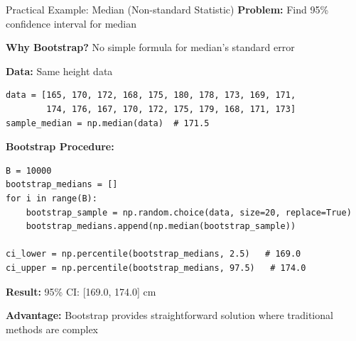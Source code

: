 \documentclass[aspectratio=169]{beamer}
\begin{document}
\begin{frame}[fragile]{Practical Example: Median (Non-standard Statistic)}
\scriptsize
\textbf{Problem:} Find 95\% confidence interval for median

\vspace{0.05cm}
\textbf{Why Bootstrap?} No simple formula for median's standard error

\vspace{0.05cm}
\textbf{Data:} Same height data
\begin{lstlisting}[basicstyle=\tiny]
data = [165, 170, 172, 168, 175, 180, 178, 173, 169, 171,
        174, 176, 167, 170, 172, 175, 179, 168, 171, 173]
sample_median = np.median(data)  # 171.5
\end{lstlisting}

\vspace{0.05cm}
\textbf{Bootstrap Procedure:}
\begin{lstlisting}[basicstyle=\tiny]
B = 10000
bootstrap_medians = []
for i in range(B):
    bootstrap_sample = np.random.choice(data, size=20, replace=True)
    bootstrap_medians.append(np.median(bootstrap_sample))

ci_lower = np.percentile(bootstrap_medians, 2.5)   # 169.0
ci_upper = np.percentile(bootstrap_medians, 97.5)   # 174.0
\end{lstlisting}

\vspace{0.05cm}
\textbf{Result:} 95\% CI: [169.0, 174.0] cm

\vspace{0.05cm}
\textbf{Advantage:} Bootstrap provides straightforward solution where traditional methods are complex
\end{frame}
\end{document}
